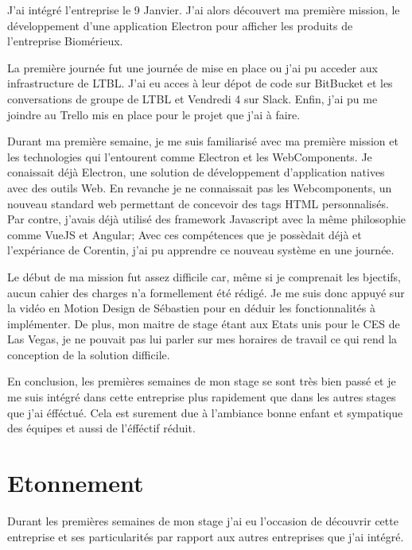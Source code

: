 \documentclass{article}
\begin{document}
J'ai intégré l'entreprise le 9 Janvier.
J'ai alors découvert ma première mission, le développement d'une application Electron pour afficher les produits de l'entreprise Biomérieux.

La première journée fut une journée de mise en place ou j'ai pu acceder aux infrastructure de LTBL.
J'ai eu acces à leur dépot de code sur BitBucket et les conversations de groupe de LTBL et Vendredi 4 sur Slack.
Enfin, j'ai pu me joindre au Trello mis en place pour le projet que j'ai à faire.

Durant ma première semaine, je me suis familiarisé avec ma première mission et les technologies qui l'entourent comme Electron et les WebComponents.
Je conaissait déjà Electron, une solution de développement d'application natives avec des outils Web.
En revanche je ne connaissait pas les Webcomponents, un nouveau standard web permettant de concevoir des tags HTML personnalisés.
Par contre, j'avais déjà utilisé des framework Javascript avec la même philosophie comme VueJS et Angular;
Avec ces compétences que je possèdait déjà et l'expériance de Corentin, j'ai pu apprendre ce nouveau système en une journée.

Le début de ma mission fut assez difficile car, même si je comprenait les bjectifs, aucun cahier des charges n'a formellement été rédigé.
Je me suis donc appuyé sur la vidéo en Motion Design de Sébastien pour en déduir les fonctionnalités à implémenter.
De plus, mon maitre de stage étant aux Etats unis pour le CES de Las Vegas, je ne pouvait pas lui parler sur mes horaires de travail ce qui rend la conception de la solution difficile.

En conclusion, les premières semaines de mon stage se sont très bien passé et je me suis intégré dans cette entreprise plus rapidement que dans les autres stages que j'ai éfféctué.
Cela est surement due à l'ambiance bonne enfant et sympatique des équipes et aussi de l'éfféctif réduit.

\section{Etonnement}

Durant les premières semaines de mon stage j'ai eu l'occasion de découvrir cette entreprise et ses particularités par rapport aux autres entreprises que j'ai intégré.
\end{document}
